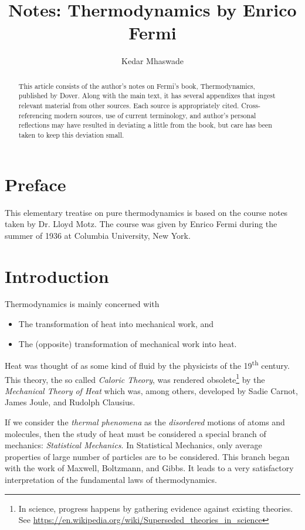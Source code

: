 \documentclass[11pt]{article}         %
\title{Notes: Thermodynamics by Enrico Fermi}
\author{Kedar Mhaswade}
\begin{document}
\maketitle

\begin{abstract}
This article consists of the author's notes on Fermi's book, Thermodynamics, published by Dover. Along with the main text, it has several appendixes that ingest relevant material from other sources. Each source is appropriately cited. Cross-referencing modern sources, use of current terminology, and author's personal reflections may have resulted in deviating a little from the book, but care has been taken to keep this deviation small.
\end{abstract}

\section{Preface}
This elementary treatise on pure thermodynamics is based on the course notes taken by Dr. Lloyd Motz. The course was given by Enrico Fermi during the summer of 1936 at Columbia University, New York.
\section{Introduction}
\label{sec: introduction}
Thermodynamics is mainly concerned with
\begin{itemize}
    \item The transformation of heat into mechanical work, and
    \item The (opposite) transformation of mechanical work into heat.
\end{itemize}
Heat was thought of as some kind of fluid by the physicists of the 19\textsuperscript{th} century. This theory, the so called \emph{Caloric Theory}, was rendered obsolete\footnote{In science, progress happens by gathering evidence against existing theories. See \url{https://en.wikipedia.org/wiki/Superseded_theories_in_science}} by the \emph{Mechanical Theory of Heat} which was, among others, developed by Sadie Carnot, James Joule, and Rudolph Clausius. 

If we consider the \emph{thermal phenomena} as the \emph{disordered} motions of atoms and molecules, then the study of heat must be considered a special branch of mechanics: \emph{Statistical Mechanics}. In Statistical Mechanics, only average properties of large number of particles are to be considered. This branch began with the work of Maxwell, Boltzmann, and Gibbs. It leads to a very satisfactory interpretation of the fundamental laws of thermodynamics.
\end{document}
